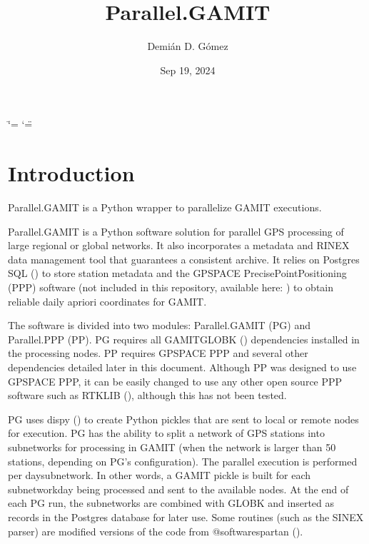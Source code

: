 \documentclass[letterpaper,10pt,english]{sphinxmanual}
\title{Parallel.GAMIT}
\date{Sep 19, 2024}
\author{Demián D.\@{} Gómez}
\begin{document}
\ifdefined\shorthandoff
  \ifnum\catcode`\=\string=\active\shorthandoff{=}\fi
  \ifnum\catcode`\"=\active{}\fi
\fi

\pagestyle{empty}
\sphinxmaketitle
\pagestyle{plain}
\sphinxtableofcontents
\pagestyle{normal}
\label{\detokenize{index::doc}}



\chapter{Introduction}
\label{\detokenize{index:introduction}}
\sphinxAtStartPar
Parallel.GAMIT is a Python wrapper to parallelize GAMIT executions.

\sphinxAtStartPar
Parallel.GAMIT is a Python software solution for parallel GPS processing of large regional or global networks. It also incorporates a metadata and RINEX data management tool that guarantees a consistent archive. It relies on Postgres SQL () to store station metadata and the GPSPACE Precise\sphinxhyphen{}Point\sphinxhyphen{}Positioning (PPP) software (not included in this repository, available here: ) to obtain reliable daily a\sphinxhyphen{}priori coordinates for GAMIT.

\sphinxAtStartPar
The software is divided into two modules: Parallel.GAMIT (PG) and Parallel.PPP (PP). PG requires all GAMIT\sphinxhyphen{}GLOBK () dependencies installed in the processing nodes. PP requires GPSPACE PPP and several other dependencies detailed later in this document. Although PP was designed to use GPSPACE PPP, it can be easily changed to use any other open source PPP software such as RTKLIB (), although this has not been tested.

\sphinxAtStartPar
PG uses dispy () to create Python pickles that are sent to local or remote nodes for execution. PG has the ability to split a network of GPS stations into subnetworks for processing in GAMIT (when the network is larger than 50 stations, depending on PG’s configuration). The parallel execution is performed per day\sphinxhyphen{}subnetwork. In other words, a GAMIT pickle is built for each subnetwork\sphinxhyphen{}day being processed and sent to the available nodes. At the end of each PG run, the subnetworks are combined with GLOBK and inserted as records in the Postgres database for later use. Some routines (such as the SINEX parser) are modified versions of the code from @softwarespartan ().
\end{document}
